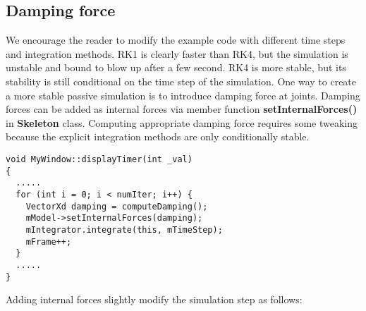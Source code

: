 \subsection{Damping force}
We encourage the reader to modify the example code with different time
steps and integration methods. RK1 is clearly faster than RK4, but the
simulation is unstable and bound to blow up after a few second. RK4 is
more stable, but its stability is still conditional on the time step
of the simulation. One way to create a more stable passive simulation
is to introduce damping force at joints. Damping forces can be added
as internal forces via member function \textbf{setInternalForces()} in
\textbf{Skeleton} class. Computing appropriate damping force requires
some tweaking because the explicit integration methods are only
conditionally stable. 

\ttfamily
\begin{lstlisting}[caption=MyWindow.cpp]
void MyWindow::displayTimer(int _val)
{
  .....
  for (int i = 0; i < numIter; i++) {
    VectorXd damping = computeDamping();
    mModel->setInternalForces(damping);
    mIntegrator.integrate(this, mTimeStep);
    mFrame++;
  }
  .....
}
\end{lstlisting}
\rmfamily

Adding internal forces slightly modify the simulation step as follows:


